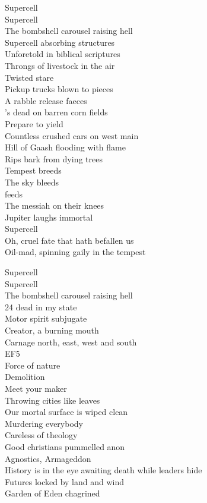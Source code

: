 Supercell\\
Supercell\\
The bombshell carousel raising hell\\

Supercell absorbing structures\\
Unforetold in biblical scriptures\\
Throngs of livestock in the air\\
Twisted stare\\
Pickup trucks blown to pieces\\
A rabble release faeces\\
's dead on barren corn fields\\
Prepare to yield\\
Countless crushed cars on west main\\
Hill of Gaash flooding with flame\\
Rips bark from dying trees\\
Tempest breeds\\
The sky bleeds\\
 feeds\\
The messiah on their knees\\
Jupiter laughs immortal\\
Supercell\\

Oh, cruel fate that hath befallen us\\
Oil-mad, spinning gaily in the tempest\

Supercell\\
Supercell\\
The bombshell carousel raising hell\\

24 dead in my state\\
Motor spirit subjugate\\
Creator, a burning mouth\\
Carnage north, east, west and south\\
EF5\\
Force of nature\\
Demolition\\
Meet your maker\\
Throwing cities like leaves\\
Our mortal surface is wiped clean\\

Murdering everybody\\
Careless of theology\\
Good christians pummelled anon\\
Agnostics, Armageddon\\
History is in the eye awaiting death while leaders hide\\
Futures locked by land and wind\\
Garden of Eden chagrined\\

